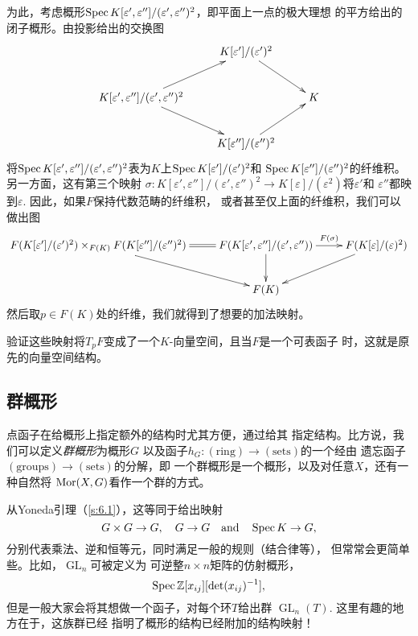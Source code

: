 为此，考虑概形$\operatorname{Spec} K[\varepsilon', \varepsilon''] /
(\varepsilon', \varepsilon'')^{2}$，即平面上一点的极大理想
的平方给出的闭子概形。由投影给出的交换图%
\[
	\xymatrix{
	& K[\varepsilon']/(\varepsilon')^2 \ar[rd] &\\
	K[\varepsilon',\varepsilon'']/(\varepsilon',\varepsilon'')^2 \ar[ru]\ar[rd]& & K\\
	& K[\varepsilon'']/(\varepsilon'')^2 \ar[ru] &
	}
\]
将$\operatorname{Spec} K[\varepsilon', \varepsilon''] /(\varepsilon', \varepsilon'')
^{2}$表为$K$上$\operatorname{Spec} K[\varepsilon'] /(\varepsilon')^{2}$和
$\operatorname{Spec} K[\varepsilon''] /(\varepsilon'')^{2}$的纤维积。
另一方面，这有第三个映射
$\sigma: K[\varepsilon', \varepsilon''] /(\varepsilon', \varepsilon''
)^{2} \to K[\varepsilon] /(\varepsilon^{2})$将$\varepsilon'$和
$\varepsilon''$都映到$\varepsilon$. 因此，如果$F$保持代数范畴的纤维积，
或者甚至仅上面的纤维积，我们可以做出图
\[
	\xymatrix{
	F(K[\varepsilon']/(\varepsilon')^2)\times_{F(K)} F(K[\varepsilon'']/(\varepsilon'')^2)\ar[rd]\ar@{=}[r]&F(K[\varepsilon',\varepsilon'']/(\varepsilon',\varepsilon'')) \ar[r]^-{F(\sigma)}\ar[d]& F(K[\varepsilon]/(\varepsilon)^2)\ar[ld]\\
	& F(K) &
	}
\]
然后取$p\in F(K)$处的纤维，我们就得到了想要的加法映射。

\begin{exe}
	验证这些映射将$T_pF$变成了一个$K$-向量空间，且当$F$是一个可表函子
	时，这就是原先的向量空间结构。
\end{exe}

\subsection{群概形} \label{s:6.1.4}

点函子在给概形上指定额外的结构时尤其方便，通过给其
指定结构。比方说，我们可以定义\textit{群概形}为概形$G$
以及函子$h_G:(\text{ring})\to (\text{sets})$的一个经由
遗忘函子$(\text{groups})\to (\text{sets})$的分解，即
一个群概形是一个概形，以及对任意$X$，还有一种自然将
$\operatorname{Mor}(X,G)$看作一个群的方式。

从Yoneda引理（\ref{s:6.1}），这等同于给出映射
\[
	G\times G\to G,\quad G\to G\quad \text{and}
	\quad \operatorname{Spec} K\to G,
\]
分别代表乘法、逆和恒等元，同时满足一般的规则（结合律等），
但常常会更简单些。比如，$\operatorname{GL}_n$可被定义为
可逆整$n\times n$矩阵的仿射概形，
\[
	\operatorname{Spec} \mathbb{Z}[x_{ij}][\det (x_{ij})^{-1}],
\]
但是一般大家会将其想做一个函子，对每个环$T$给出群
$\operatorname{GL}_n(T)$. 这里有趣的地方在于，这族群已经
指明了概形的结构已经附加的结构映射！
